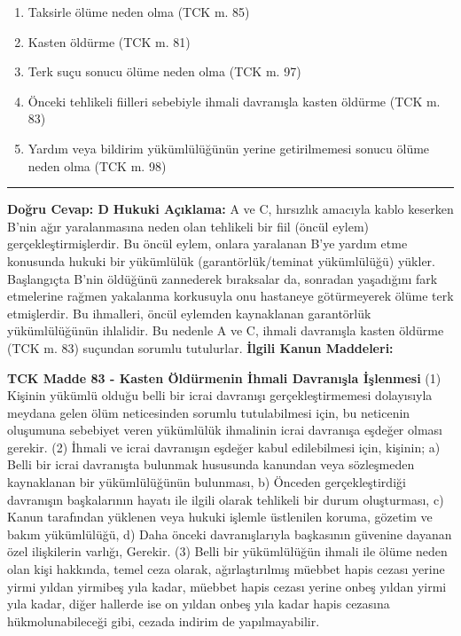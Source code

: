 \documentclass[a4paper, 11pt, twocolumn]{article}
\newenvironment{lawbox}{%
    \par\noindent
    \begin{tcolorbox}[
        colback=lawbg,
        colframe=boxcolor,
        fonttitle=\bfseries,
        boxrule=0.5pt,
        left=3pt,
        right=3pt,
        top=3pt,
        bottom=3pt,
        width=\columnwidth,
        arc=2pt,
        before skip=0.2cm,
        after skip=0.2cm
    ]
    \footnotesize\itshape
}{\end{tcolorbox}}
\begin{document}
\begin{enumerate}[label=\Alph*)]
    \item Taksirle ölüme neden olma (TCK m. 85)
    \item Kasten öldürme (TCK m. 81)
    \item Terk suçu sonucu ölüme neden olma (TCK m. 97)
    \item Önceki tehlikeli fiilleri sebebiyle ihmali davranışla kasten öldürme (TCK m. 83)
    \item Yardım veya bildirim yükümlülüğünün yerine getirilmemesi sonucu ölüme neden olma (TCK m. 98)
\end{enumerate}
\vspace{0.5cm}
\hrule
\vspace{0.5cm}
\textbf{Doğru Cevap: D}
\newline
\textbf{Hukuki Açıklama:} A ve C, hırsızlık amacıyla kablo keserken B'nin ağır yaralanmasına neden olan tehlikeli bir fiil (öncül eylem) gerçekleştirmişlerdir. Bu öncül eylem, onlara yaralanan B'ye yardım etme konusunda hukuki bir yükümlülük (garantörlük/teminat yükümlülüğü) yükler. Başlangıçta B'nin öldüğünü zannederek bıraksalar da, sonradan yaşadığını fark etmelerine rağmen yakalanma korkusuyla onu hastaneye götürmeyerek ölüme terk etmişlerdir. Bu ihmalleri, öncül eylemden kaynaklanan garantörlük yükümlülüğünün ihlalidir. Bu nedenle A ve C, ihmali davranışla kasten öldürme (TCK m. 83) suçundan sorumlu tutulurlar.
\vspace{0.5cm}
\textbf{İlgili Kanun Maddeleri:}
\begin{lawbox}
\textbf{TCK Madde 83 - Kasten Öldürmenin İhmali Davranışla İşlenmesi}
\newline
(1) Kişinin yükümlü olduğu belli bir icrai davranışı gerçekleştirmemesi dolayısıyla meydana gelen ölüm neticesinden sorumlu tutulabilmesi için, bu neticenin oluşumuna sebebiyet veren yükümlülük ihmalinin icrai davranışa eşdeğer olması gerekir.
\newline
(2) İhmali ve icrai davranışın eşdeğer kabul edilebilmesi için, kişinin;
a) Belli bir icrai davranışta bulunmak hususunda kanundan veya sözleşmeden kaynaklanan bir yükümlülüğünün bulunması,
b) Önceden gerçekleştirdiği davranışın başkalarının hayatı ile ilgili olarak tehlikeli bir durum oluşturması,
c) Kanun tarafından yüklenen veya hukuki işlemle üstlenilen koruma, gözetim ve bakım yükümlülüğü,
d) Daha önceki davranışlarıyla başkasının güvenine dayanan özel ilişkilerin varlığı,
Gerekir.
\newline
(3) Belli bir yükümlülüğün ihmali ile ölüme neden olan kişi hakkında, temel ceza olarak, ağırlaştırılmış müebbet hapis cezası yerine yirmi yıldan yirmibeş yıla kadar, müebbet hapis cezası yerine onbeş yıldan yirmi yıla kadar, diğer hallerde ise on yıldan onbeş yıla kadar hapis cezasına hükmolunabileceği gibi, cezada indirim de yapılmayabilir.
\end{lawbox}
\end{document}
